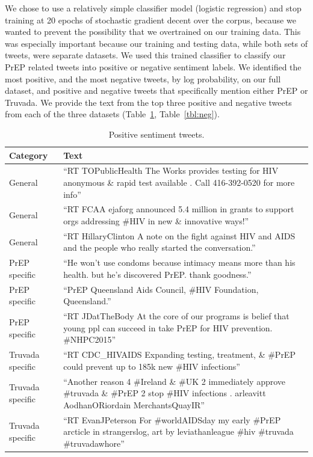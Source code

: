 \documentclass[conference]{IEEEtran}
\begin{document}
We chose to use a relatively simple classifier model (logistic regression) and stop training at 20 epochs of stochastic gradient decent over the corpus, because we wanted to prevent the possibility that we overtrained on our training data. This was especially important because our training and testing data, while both sets of tweets, were separate datasets. We used this trained classifier to classify our PrEP related tweets into positive or negative sentiment labels. We identified the most positive, and the most negative tweets, by log probability, on our full dataset, and positive and negative tweets that specifically mention either PrEP or Truvada. We provide the text from the top three positive and negative tweets from each of the three datasets (Table~\ref{tbl:pos}, Table~\ref{tbl:neg}).

\begin{table}
\centering
\caption{Positive sentiment tweets.}
\begin{tabular}{|p{2.5cm}|p{12cm}|} \hline
Category & Text\\ \hline
General & ``RT TOPublicHealth The Works provides testing for HIV anonymous \& rapid test available . Call 416-392-0520 for more info''\\ \hline
General & ``RT FCAA ejaforg announced 5.4 million in grants to support orgs addressing \#HIV in new \& innovative ways!''\\ \hline
General & ``RT HillaryClinton A note on the fight against HIV and AIDS and the people who really started the conversation.''\\ \hline

PrEP specific & ``He won't use condoms because intimacy means more than his health. but he's discovered PrEP. thank goodness.''\\ \hline
PrEP specific & ``PrEP Queensland Aids Council, \#HIV Foundation, Queensland.''\\ \hline
PrEP specific & ``RT JDatTheBody At the core of our programs is belief that young ppl can succeed in take PrEP for HIV prevention. \#NHPC2015''\\ \hline

Truvada specific & ``RT CDC\_HIVAIDS Expanding testing, treatment, \& \#PrEP could prevent up to 185k new \#HIV infections''\\ \hline
Truvada specific & ``Another reason 4 \#Ireland \& \#UK 2 immediately approve \#truvada \& \#PrEP 2 stop \#HIV infections . arleavitt AodhanORiordain MerchantsQuayIR''\\ \hline
Truvada specific & ``RT EvanJPeterson For \#worldAIDSday my early \#PrEP arcticle in strangerslog, art by leviathanleague \#hiv \#truvada \#truvadawhore''\\ \hline

\hline\end{tabular}
\label{tbl:pos}
\end{table}
\end{document}
